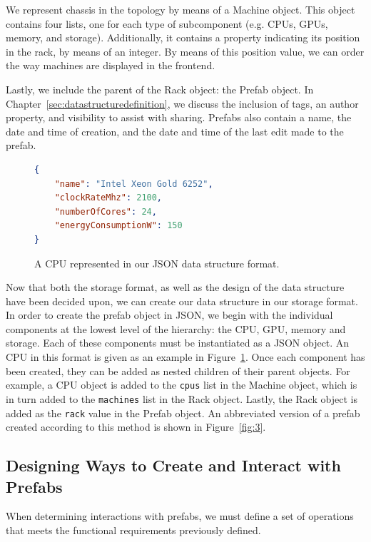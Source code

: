 \documentclass[11pt]{article}
\begin{document}
			We represent chassis in the topology by means of a Machine object. 
			This object contains four lists, one for each type of subcomponent (e.g. CPUs, GPUs, memory, and storage).
			Additionally, it contains a property indicating its position in the rack, by means of an integer.
			By means of this position value, we can order the way machines are displayed in the \opendc{} frontend.

			Lastly, we include the parent of the Rack object: the Prefab object.
			In Chapter~\ref{sec:datastructuredefinition}, we discuss the inclusion of tags, an author property, and visibility to assist with sharing.
			Prefabs also contain a name, the date and time of creation, and the date and time of the last edit made to the prefab.

			\bigbreak
			\begin{figure}[h]
			\centering
				\begin{lstlisting}[language=json]
{
	"name": "Intel Xeon Gold 6252",
	"clockRateMhz": 2100,
	"numberOfCores": 24,
	"energyConsumptionW": 150
}
			\end{lstlisting}
				\caption[A JSON representation of a CPU]{A CPU represented in our JSON data structure format.}
				\label{fig:jsoncpu}
			\end{figure}

			Now that both the storage format, as well as the design of the data structure have been decided upon, we can create our data structure in our storage format.
			In order to create the prefab object in JSON, we begin with the individual components at the lowest level of the hierarchy: the CPU, GPU, memory and storage.
			Each of these components must be instantiated as a JSON object.
			An CPU in this format is given as an example in Figure~\ref{fig:jsoncpu}.
			Once each component has been created, they can be added as nested children of their parent objects.
			For example, a CPU object is added to the \verb|cpus| list in the Machine object, which is in turn added to the \verb|machines| list in the Rack object.
			Lastly, the Rack object is added as the \verb|rack| value in the Prefab object.
			An abbreviated version of a prefab created according to this method is shown in Figure~\ref{fig:3}.
			



	\subsection{Designing Ways to Create and Interact with Prefabs}
		When determining interactions with prefabs, we must define a set of operations that meets the functional requirements previously defined.
		
\end{document}
